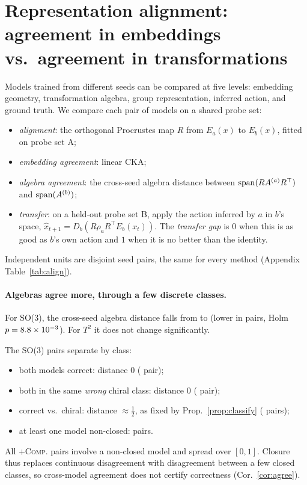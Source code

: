 \section{Representation alignment: agreement in embeddings vs.\ agreement in transformations}\label{sec:align}
Models trained from different seeds can be compared at five levels: embedding geometry, transformation algebra,
group representation, inferred action, and ground truth. We compare each pair of models on a shared probe set:
\begin{itemize}
\item \emph{alignment}: the orthogonal Procrustes map $R$ from $E_a(x)$ to $E_b(x)$, fitted on probe set A;
\item \emph{embedding agreement}: linear CKA;
\item \emph{algebra agreement}: the cross-seed algebra distance between $\operatorname{span}(RA^{(a)}R^\top)$ and $\operatorname{span}(A^{(b)})$;
\item \emph{transfer}: on a held-out probe set B, apply the action inferred by $a$ in $b$'s space,
$\hat x_{t+1}=D_b(R\rho_aR^\top E_b(x_t))$. The \emph{transfer gap} is $0$ when this is as good as $b$'s own action
and $1$ when it is no better than the identity.
\end{itemize}
Independent units are \NNpairs{} disjoint seed pairs, the same for every method (Appendix Table~\ref{tab:align}).


\paragraph{Algebras agree more, through a few discrete classes.}
For SO(3), the cross-seed algebra distance falls from \NHthreeSOthreeMeanb{} to \NHthreeSOthreeMeana{} (lower in
\NHthreeSOthreeWins{} pairs, Holm $p=8.8\times10^{-3}$). For $T^2$ it does not change significantly.

The SO(3) pairs separate by class:
\begin{itemize}
\item both models correct: distance $0$ (\NPtSOthreeBNBothcorrect{} pair);
\item both in the same \emph{wrong} chiral class: distance $0$ (\NPtSOthreeBNBothsameincorrecttype{} pair);
\item correct vs.\ chiral: distance $\approx\frac12$, as fixed by Prop.~\ref{prop:classify} (\NPtSOthreeBNCloseddifferenttypes{} pairs);
\item at least one model non-closed: \NPtSOthreeBNInvolvesnonclosedorcollapsed{} pairs.
\end{itemize}
All \NPtSOthreeCompInvolvesnonclosedorcollapsed{} \textsc{+Comp.} pairs involve a non-closed model and spread over
$[0,1]$. Closure thus replaces continuous disagreement with disagreement between a few closed classes, so
cross-model agreement does not certify correctness (Cor.~\ref{cor:agree}).

